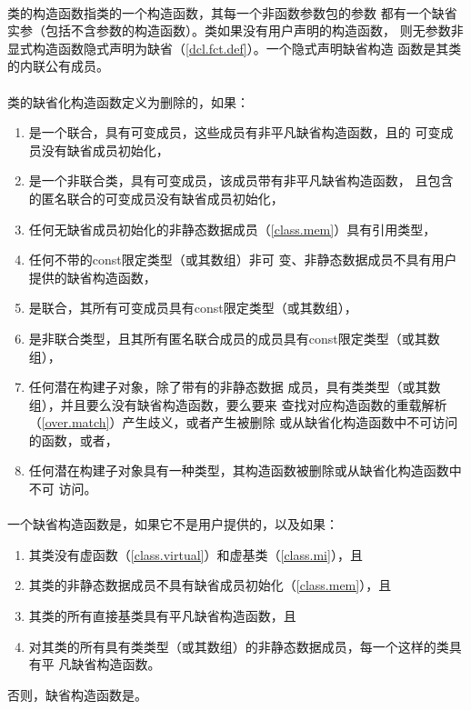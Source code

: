 \paragraph{}
类的构造函数指类的一个构造函数，其每一个非函数参数包的参数
都有一个缺省实参（包括不含参数的构造函数）。类如果没有用户声明的构造函数，
则无参数非显式构造函数隐式声明为缺省（\ref{dcl.fct.def}）。一个隐式声明缺省构造
函数是其类的内联公有成员。

\paragraph{}
类的缺省化构造函数定义为删除的，如果：
\begin{enumerate}
  \item{是一个联合，具有可变成员，这些成员有非平凡缺省构造函数，且的
    可变成员没有缺省成员初始化，}
  \item{是一个非联合类，具有可变成员，该成员带有非平凡缺省构造函数，
    且包含的匿名联合的可变成员没有缺省成员初始化，}
  \item{任何无缺省成员初始化的非静态数据成员（\ref{class.mem}）具有引用类型，}
  \item{任何不带的const限定类型（或其数组）非可
    变、非静态数据成员不具有用户提供的缺省构造函数，}
  \item{是联合，其所有可变成员具有const限定类型（或其数组），}
  \item{是非联合类型，且其所有匿名联合成员的成员具有const限定类型（或其数
    组），}
  \item{任何潜在构建子对象，除了带有的非静态数据
    成员，具有类类型（或其数组），并且要么没有缺省构造函数，要么要来
    查找对应构造函数的重载解析（\ref{over.match}）产生歧义，或者产生被删除
    或从缺省化构造函数中不可访问的函数，或者，}
  \item{任何潜在构建子对象具有一种类型，其构造函数被删除或从缺省化构造函数中不可
    访问。}
\end{enumerate}

\paragraph{}
一个缺省构造函数是，如果它不是用户提供的，以及如果：
\begin{enumerate}
  \item{其类没有虚函数（\ref{class.virtual}）和虚基类（\ref{class.mi}），且}
  \item{其类的非静态数据成员不具有缺省成员初始化（\ref{class.mem}），且}
  \item{其类的所有直接基类具有平凡缺省构造函数，且}
  \item{对其类的所有具有类类型（或其数组）的非静态数据成员，每一个这样的类具有平
    凡缺省构造函数。}
\end{enumerate}
否则，缺省构造函数是。

